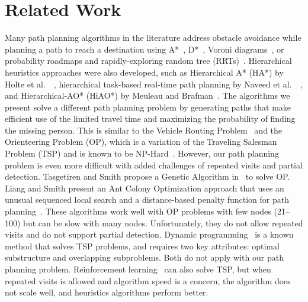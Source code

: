 \documentclass[journal]{IEEEtran}
\begin{document}
\section{Related Work}
\label{sec:RelatedWork}

Many path planning algorithms in the literature address obstacle avoidance while planning a path to reach a destination using A*~\cite{Quigley2005Toward}, D*~\cite{stentz1997optimal}, Voroni diagrams~\cite{bortoff2000path}, or probability roadmaps and rapidly-exploring random tree (RRTs)~\cite{pettersson2006probabilistic}. Hierarchical heuristics approaches were also developed, such as Hierarchical A* (HA*) by Holte et al.\ ~\cite{holte1996hierarchical}, hierarchical task-based real-time path planning by Naveed et al.\ ~\cite{meuleau2007hierarchical}, and Hierarchical-AO* (HiAO*) by Meuleau and Brafman~\cite{naveed2010hierarchical}. The algorithms we present solve a different path planning problem by generating paths that make efficient use of the limited travel time and maximizing the probability of finding the missing person. This is similar to the Vehicle Routing Problem~\cite{laporte1992vehicle} and the Orienteering Problem (OP), which is a variation of the Traveling Salesman Problem (TSP) and is known to be NP-Hard~\cite{Sokkappa1990Cost}. However, our path planning problem is even more difficult with added challenges of repeated visits and partial detection. 
Tasgetiren and Smith propose a Genetic Algorithm in~\cite{Tasgetiren2000GA} to solve OP. Liang and Smith present an Ant Colony Optimization approach that uses an unusual sequenced local search and a distance-based penalty function for path planning~\cite{Liang2006AntOrienteering}. These algorithms work well with OP problems with few nodes (21--100) but can be slow with many nodes. Unfortunately, they do not allow repeated visits and do not support partial detection. Dynamic programming~\cite{sniedovich2010dynamic} is a known method that solves TSP problems, and requires two key attributes: optimal substructure and overlapping subproblems. Both do not apply with our path planning problem. Reinforcement learning~\cite{russell2009artificial} can also solve TSP, but when repeated visits is allowed and algorithm speed is a concern, the algorithm does not scale well, and heuristics algorithms perform better.
\end{document}
